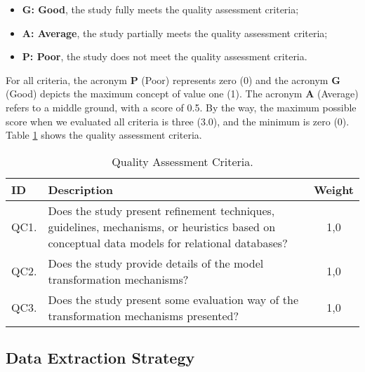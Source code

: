 \begin{itemize}
    \item \textbf{G: Good}, the study fully meets the quality assessment criteria;
    \item \textbf{A: Average}, the study partially meets the quality assessment criteria;
    \item \textbf{P: Poor}, the study does not meet the quality assessment criteria.
\end{itemize}

For all criteria, the acronym \textbf{P} (Poor) represents zero (0) and the acronym \textbf{G} (Good) depicts the maximum concept of value one (1).
The acronym \textbf{A} (Average) refers to a middle ground, with a score of 0.5.
By the way, the maximum possible score when we evaluated all criteria is three (3.0), and the minimum is zero (0).
Table \ref{tab:QAC} shows the quality assessment criteria.

\begin{table}[!htb]
    \centering
    \footnotesize
    \caption{Quality Assessment Criteria.}
    \label{tab:QAC}
    \begin{tabular}{l|p{12cm}|c}
    \bottomrule
    \rowcolor[HTML]{C0C0C0}
    \textbf{ID} & \textbf{Description} & \textbf{Weight} 
    \\ 
    \hline
    QC1. & Does the study present refinement techniques, guidelines, mechanisms, or heuristics based on conceptual data models for relational databases? & 1,0 
    \\
    QC2. & Does the study provide details of the model transformation mechanisms? & 1,0 
    \\
    QC3. & Does the study present some evaluation way of the transformation mechanisms presented? & 1,0 
    \\
    \toprule
    \end{tabular}
\end{table}

\subsection{Data Extraction Strategy} \label{ssec_slm:dataExtraction}

